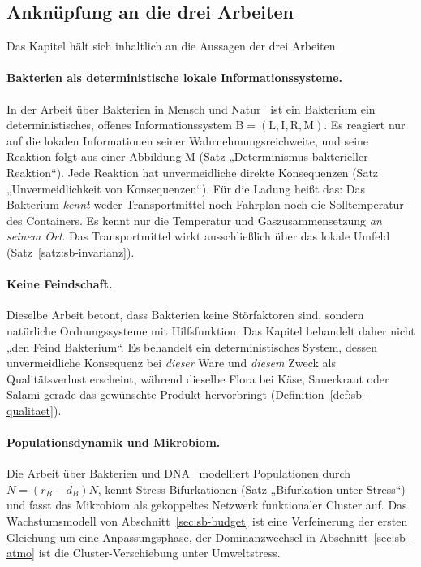 \documentclass[a4paper, 12pt, twoside, openright]{report}
\theoremstyle{definition}
\theoremstyle{definition}
\begin{document}
\subsection{Anknüpfung an die drei Arbeiten}

Das Kapitel hält sich inhaltlich an die Aussagen der drei Arbeiten.

\paragraph{Bakterien als deterministische lokale Informationssysteme.}
In der Arbeit über Bakterien in Mensch und Natur~\cite{epp_bakterien} ist ein Bakterium ein
deterministisches, offenes Informationssystem $\mathrm B=(\mathrm L,\mathrm I,\mathrm R,\mathrm M)$.
Es reagiert nur auf die lokalen Informationen seiner Wahrnehmungsreichweite, und seine
Reaktion folgt aus einer Abbildung $\mathrm M$ (Satz „Determinismus bakterieller
Reaktion“). Jede Reaktion hat unvermeidliche direkte Konsequenzen (Satz „Unvermeidlichkeit
von Konsequenzen“). Für die Ladung heißt das: Das Bakterium \emph{kennt} weder
Transportmittel noch Fahrplan noch die Solltemperatur des Containers. Es kennt nur die
Temperatur und Gaszusammensetzung \emph{an seinem Ort}. Das Transportmittel wirkt
ausschließlich über das lokale Umfeld (Satz~\ref{satz:sb-invarianz}).

\paragraph{Keine Feindschaft.}
Dieselbe Arbeit betont, dass Bakterien keine Störfaktoren sind, sondern natürliche
Ordnungssysteme mit Hilfsfunktion. Das Kapitel behandelt daher nicht „den Feind Bakterium“.
Es behandelt ein deterministisches System, dessen unvermeidliche Konsequenz bei \emph{dieser}
Ware und \emph{diesem} Zweck als Qualitätsverlust erscheint, während dieselbe Flora bei
Käse, Sauerkraut oder Salami gerade das gewünschte Produkt hervorbringt
(Definition~\ref{def:sb-qualitaet}).

\paragraph{Populationsdynamik und Mikrobiom.}
Die Arbeit über Bakterien und DNA~\cite{epp_bgies} modelliert Populationen durch
$\dot N=(r_B-d_B)N$, kennt Stress-Bifurkationen (Satz „Bifurkation unter Stress“) und
fasst das Mikrobiom als gekoppeltes Netzwerk funktionaler Cluster auf. Das Wachstumsmodell
von Abschnitt~\ref{sec:sb-budget} ist eine Verfeinerung der ersten Gleichung um eine
Anpassungsphase, der Dominanzwechsel in Abschnitt~\ref{sec:sb-atmo} ist die
Cluster-Verschiebung unter Umweltstress.
\end{document}
